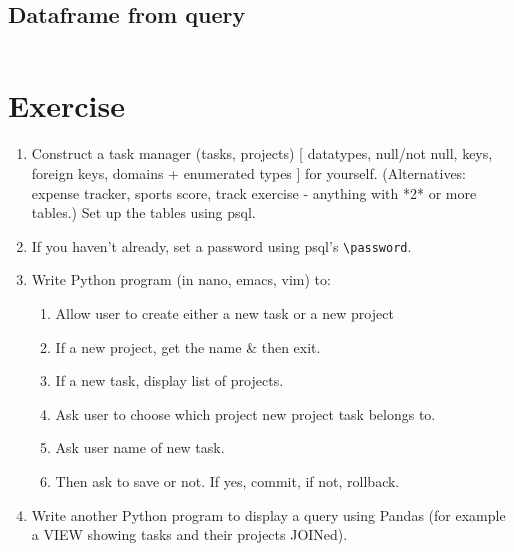 \subsection{Dataframe from query}\label{sec:dataframe-from-query}

\inputminted{python}{dataframe_from_query.py}

\section{Exercise}\label{exercise}

\begin{enumerate}
\item
  Construct a task manager (tasks, projects) {[} datatypes, null/not
  null, keys, foreign keys, domains + enumerated types {]} for yourself.
  (Alternatives: expense tracker, sports score, track exercise -
  anything with *2* or more tables.) Set up the tables using psql.
\item
  If you haven't already, set a password using psql's
  \texttt{\textbackslash{}password}.
\item
  Write Python program (in nano, emacs, vim) to:

  \begin{enumerate}
  \def\labelenumii{\arabic{enumii}.}
  \item
    Allow user to create either a new task or a new project
  \item
    If a new project, get the name \& then exit.
  \item
    If a new task, display list of projects.
  \item
    Ask user to choose which project new project task belongs to.
  \item
    Ask user name of new task.
  \item
    Then ask to save or not. If yes, commit, if not, rollback.
  \end{enumerate}
\item
  Write another Python program to display a query using Pandas (for
  example a VIEW showing tasks and their projects JOINed).
\end{enumerate}



